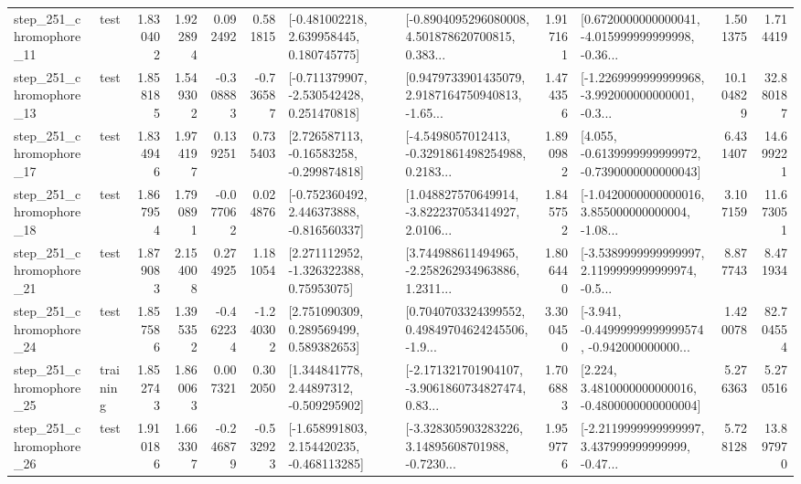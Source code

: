 \begin{tabular}{llrrrrllrlrr}
  step\_251\_chromophore\_11 &      test &      1.830402 &    1.922894 &      0.092492 &  0.581815 &    [-0.481002218, 2.639958445, 0.180745775] &  [-0.8904095296080008, 4.501878620700815, 0.383... &       1.917161 &  [0.6720000000000041, -4.015999999999998, -0.36... &            1.501375 &          1.714419 \\
  step\_251\_chromophore\_13 &      test &      1.858185 &    1.549302 &     -0.308883 & -0.736587 &   [-0.711379907, -2.530542428, 0.251470818] &  [0.9479733901435079, 2.9187164750940813, -1.65... &       1.474356 &  [-1.2269999999999968, -3.992000000000001, -0.3... &           10.104829 &         32.880187 \\
  step\_251\_chromophore\_17 &      test &      1.834946 &    1.974197 &      0.139251 &  0.735403 &    [2.726587113, -0.16583258, -0.299874818] &  [-4.5498057012413, -0.3291861498254988, 0.2183... &       1.890982 &  [4.055, -0.6139999999999972, -0.7390000000000043] &            6.431407 &         14.699221 \\
  step\_251\_chromophore\_18 &      test &      1.867954 &    1.790891 &     -0.077062 &  0.024876 &   [-0.752360492, 2.446373888, -0.816560337] &  [1.048827570649914, -3.822237053414927, 2.0106... &       1.845752 &  [-1.0420000000000016, 3.855000000000004, -1.08... &            3.107159 &         11.673051 \\
  step\_251\_chromophore\_21 &      test &      1.879083 &    2.154008 &      0.274925 &  1.181054 &     [2.271112952, -1.326322388, 0.75953075] &  [3.744988611494965, -2.258262934963886, 1.2311... &       1.806440 &  [-3.5389999999999997, 2.1199999999999974, -0.5... &            8.877743 &          8.471934 \\
  step\_251\_chromophore\_24 &      test &      1.857586 &    1.395352 &     -0.462234 & -1.240302 &     [2.751090309, 0.289569499, 0.589382653] &  [0.7040703324399552, 0.49849704624245506, -1.9... &       3.300450 &  [-3.941, -0.44999999999999574, -0.942000000000... &            1.420078 &         82.704554 \\
  step\_251\_chromophore\_25 &  training &      1.852743 &    1.860063 &      0.007321 &  0.302050 &     [1.344841778, 2.44897312, -0.509295902] &  [-2.171321701904107, -3.9061860734827474, 0.83... &       1.706883 &   [2.224, 3.4810000000000016, -0.4800000000000004] &            5.276363 &          5.270516 \\
  step\_251\_chromophore\_26 &      test &      1.910186 &    1.663307 &     -0.246879 & -0.532923 &   [-1.658991803, 2.154420235, -0.468113285] &  [-3.328305903283226, 3.14895608701988, -0.7230... &       1.959776 &  [-2.2119999999999997, 3.437999999999999, -0.47... &            5.728128 &         13.897970 \\

\end{tabular}
